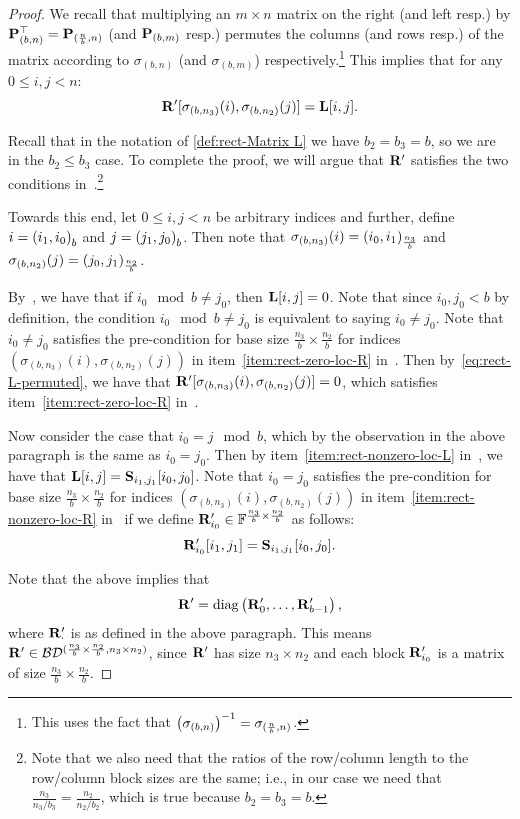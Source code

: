 \begin{proof}
We recall  that multiplying an $m\times n$ matrix on the right (and left resp.) by $\mathbf{P}_{(b,n)}^\top = \mathbf{P}_{(\frac nb,n)}$ (and $\mathbf{P}_{(b,m)}$ resp.) permutes the columns (and rows resp.) of the matrix according to $\sigma_{(b,n)}$ (and $\sigma_{(b,m)}$) respectively.\footnote{This uses the fact that $\left( {\sigma_{(b,n)}}\right)^{-1}=\sigma_{(\frac nb,n)}$.} This implies that for any $0\le i,j<n$:
\begin{equation}
\label{eq:rect-L-permuted}
\mathbf{R}'[\sigma_{(b,n_3)}(i),\sigma_{(b,n_2)}(j)]=\mathbf{L}[i,j].
\end{equation}


Recall that in the notation of \cref{def:rect-Matrix L} we have $b_2=b_3=b$, so we are in the $b_2 \le b_3$ case.
To complete the proof, we will argue that $\mathbf{R}'$ satisfies the two conditions in~.\footnote{Note that we also need that the ratios of the row/column length to the row/column block sizes are the same; i.e., in our case we need that $\frac{n_3}{n_3 / b_3}=\frac{n_2}{n_2 / b_2}$, which is true because $b_2=b_3=b$.}

Towards this end, let $0\le i,j<n$ be arbitrary indices and further, define $i=\left( {{i_1},{i_0}}\right)_{{b}}$ and $j=\left( {{j_1},{j_0}}\right)_{{b}}$. Then note that $\sigma_{(b,n_3)}(i)=\left( {{i_0},{i_1}}\right)_{{\frac {n_3}{b}}}$ and $\sigma_{(b,n_2)}(j)=\left( {{j_0},{j_1}}\right)_{{\frac {n_2}{b}}}$.

By~, we have that if $i_0\mod{b}\ne j_0$, then $\mathbf{L}[i,j]=0$. Note  that since $i_0,j_0<b$ by definition, the condition $i_0\mod{b}\ne j_0$ is equivalent to saying $i_0\ne j_0$. Note that $i_0\ne j_0$ satisfies the pre-condition for base size $\frac {n_3}{b}\times \frac{n_2}{b}$ for indices $(\sigma_{(b,n_3)}(i),\sigma_{(b,n_2)}(j))$ in item~\ref{item:rect-zero-loc-R} in~.  Then   by~\cref{eq:rect-L-permuted}, we have that $\mathbf{R}'[\sigma_{(b,n_3)}(i),\sigma_{(b,n_2)}(j)]=0$, which satisfies item~\ref{item:rect-zero-loc-R} in~.

Now consider the case that $i_0=j\mod b$, which by the observation in the above paragraph is the same as $i_0=j_0$. Then by item~\ref{item:rect-nonzero-loc-L} in~, we have that $\mathbf{L}[i,j]=\mathbf{S}_{i_1,j_1}[i_0,j_0]$.  Note that $i_0= j_0$ satisfies the pre-condition for base size $\frac{n_3}{b}\times \frac{n_2}{b}$ for indices $(\sigma_{(b,n_3)}(i),\sigma_{(b,n_2)}(j))$ in item~\ref{item:rect-nonzero-loc-R} in~ if we define $\mathbf{R}'_{i_0}\in\mathbb{F}^{\frac{n_3}{b}\times\frac{n_2}{b}}$ as follows:
\[\mathbf{R}'_{i_0}[i_1,j_1]=\mathbf{S}_{i_1,j_1}[i_0,j_0].\] 

Note that the above implies that 
\[\mathbf{R}'=\mathrm{diag}\left( {\mathbf{R}'_0,\dots,\mathbf{R}'_{b-1}}\right),\]
where $\mathbf{R}'_{\cdot}$ is as defined in the above paragraph.
This means $\mathbf{R}' \in \mathcal{B}\mathcal{D}^{(\frac{n_3}{b} \times \frac{n_2}{b}, n_3 \times n_2)}$, since $\mathbf{R}'$ has size $n_3 \times n_2$ and each block $\mathbf{R}_{i_0}'$ is a matrix of size $\frac{n_3}{b} \times \frac{n_2}{b}$.
\end{proof}